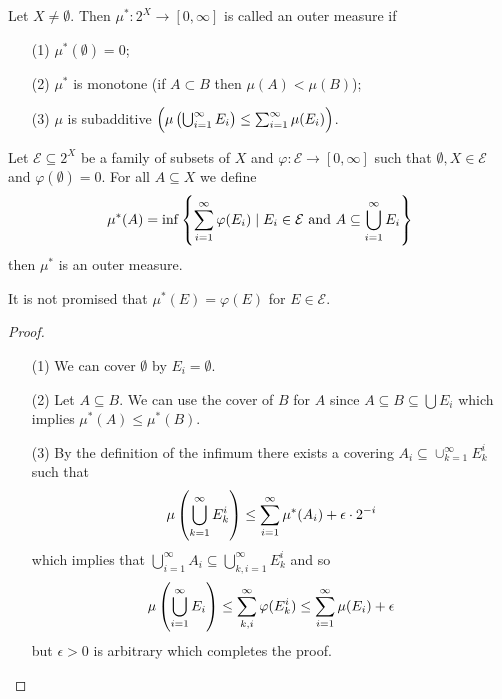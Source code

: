 \documentclass[11pt,a4paper]{article}
\begin{document}
\begin{definition}
  Let $X \neq \emptyset$. Then $\mu^* \colon 2^X \to [0,\infty]$ is
  called an outer measure if
  \begin{enumerate}
    \item[(1)] $\mu^*(\emptyset) = 0$;
    \item[(2)] $\mu^*$ is monotone (if $A \subset B$ then $\mu(A) < \mu(B)$);
    \item[(3)] $\mu$ is subadditive 
      $\del{\mu\del{\bigcup_{i=1}^{\infty} E_i} \le 
      \sum_{i=1}^{\infty} \mu(E_i)}$.
  \end{enumerate}
\end{definition}

\begin{proposition}
  Let $\mathcal E \subseteq 2^X$ be a family of subsets of $X$ and
  $\varphi \colon \mathcal E \to [0,\infty]$ such that
  $\emptyset, X \in \mathcal E$ and $\varphi(\emptyset) = 0$.
  For all $A \subseteq X$ we define
  \[
    \mu^*(A) = \inf\set{\sum_{i=1}^{\infty} \varphi(E_i) \mid 
    E_i \in \mathcal E \text{ and }A \subseteq \bigcup_{i=1}^{\infty} E_i}
  \]
  then $\mu^*$ is an outer measure.
\end{proposition}
\begin{remark}
  It is not promised that $\mu^*(E) = \varphi(E)$ for $E \in \mathcal E$.
\end{remark}
\begin{proof} \phantom{}
\begin{enumerate}
  \item[(1)] We can cover $\emptyset$ by $E_i = \emptyset$.
  \item[(2)] Let $A \subseteq B$.
    We can use the cover of $B$ for $A$ since 
    $A \subseteq B \subseteq \bigcup E_i$ which implies $\mu^*(A) \le \mu^*(B)$.
  \item[(3)] By the definition of the infimum there exists a covering
    $A_i \subseteq \cup_{k=1}^{\infty} E_k^i$ such that
    \[
      \mu\del{\bigcup_{k=1}^{\infty} E_k^i} \le 
      \sum_{i=1}^{\infty} \mu^*(A_i) + \epsilon \cdot 2^{-i}
    \]
    which implies that 
    $\bigcup_{i=1}^{\infty} A_i \subseteq \bigcup_{k,i=1}^{\infty} E_k^i$
    and so
    \[
      \mu\del{\bigcup_{i=1}^{\infty} E_i} \le 
      \sum_{k,i}^{\infty} \varphi(E_k^i) \le
      \sum_{i=1}^{\infty} \mu(E_i) + \epsilon
    \]
    but $\epsilon > 0$ is arbitrary which completes the proof.
\end{enumerate}
\end{proof}
\end{document}
